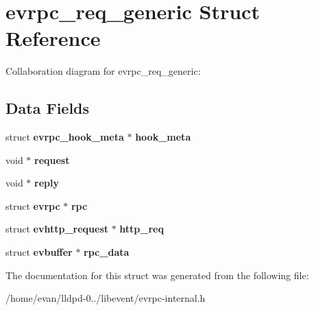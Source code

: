 \section{evrpc\-\_\-req\-\_\-generic \-Struct \-Reference}
\label{structevrpc__req__generic}


\-Collaboration diagram for evrpc\-\_\-req\-\_\-generic\-:
\subsection*{\-Data \-Fields}
\begin{DoxyCompactItemize}
\item 
struct {\bf evrpc\-\_\-hook\-\_\-meta} $\ast$ {\bfseries hook\-\_\-meta}\label{structevrpc__req__generic_a2c900a2f27e1f4361e788f3599bbf99b}

\item 
void $\ast$ {\bfseries request}\label{structevrpc__req__generic_a754b843e227c83c4fcbbd570c0828af5}

\item 
void $\ast$ {\bfseries reply}\label{structevrpc__req__generic_a3054b93eacc586713f60fe72fc620146}

\item 
struct {\bf evrpc} $\ast$ {\bfseries rpc}\label{structevrpc__req__generic_a32eb52cc5ce5924c40e75a21402fae6c}

\item 
struct {\bf evhttp\-\_\-request} $\ast$ {\bfseries http\-\_\-req}\label{structevrpc__req__generic_a02b843a8289c9d0e5ab09b1f747471d0}

\item 
struct {\bf evbuffer} $\ast$ {\bfseries rpc\-\_\-data}\label{structevrpc__req__generic_ae86927b54b46fa13cd50ce894645bb69}

\end{DoxyCompactItemize}


\-The documentation for this struct was generated from the following file\-:\begin{DoxyCompactItemize}
\item 
/home/evan/lldpd-\/0../libevent/evrpc-\/internal.\-h\end{DoxyCompactItemize}
